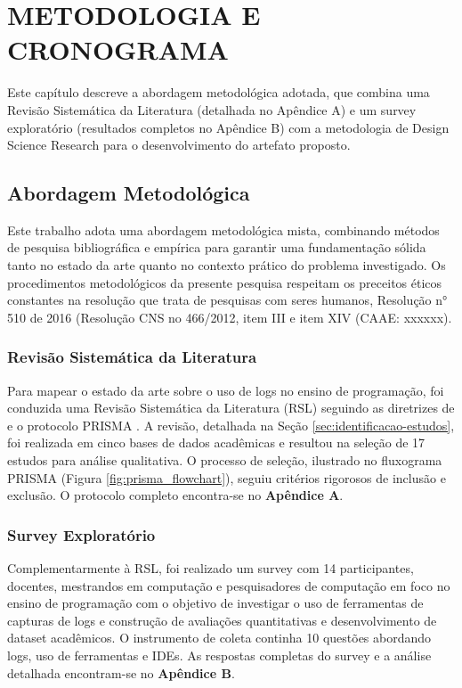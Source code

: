 \chapter{METODOLOGIA E CRONOGRAMA}
\label{cap:metodologia}

Este capítulo descreve a abordagem metodológica adotada, que combina uma Revisão Sistemática da Literatura (detalhada no Apêndice A) e um survey exploratório (resultados completos no Apêndice B) com a metodologia de Design Science Research para o desenvolvimento do artefato proposto. 

\section{Abordagem Metodológica}
\label{sec:abordagem-metodologica}
Este trabalho adota uma abordagem metodológica mista, combinando métodos de pesquisa bibliográfica e empírica para garantir uma fundamentação sólida tanto no estado da arte quanto no contexto prático do problema investigado. Os procedimentos metodológicos da presente pesquisa respeitam os preceitos éticos constantes na resolução que trata de pesquisas com seres humanos, Resolução n° 510 de 2016 (Resolução CNS no 466/2012, item III e item XIV (CAAE: xxxxxx).

\subsection{Revisão Sistemática da Literatura}
\label{subsec:revisao-sistematica}

Para mapear o estado da arte sobre o uso de logs no ensino de programação, foi conduzida uma Revisão Sistemática da Literatura (RSL) seguindo as diretrizes de \cite{kitchenham2004procedures} e o protocolo PRISMA \cite{page2021prisma}. A revisão, detalhada na Seção \ref{sec:identificacao-estudos}, foi realizada em cinco bases de dados acadêmicas e resultou na seleção de 17 estudos para análise qualitativa. O processo de seleção, ilustrado no fluxograma PRISMA (Figura \ref{fig:prisma_flowchart}), seguiu critérios rigorosos de inclusão e exclusão. O protocolo completo encontra-se no \textbf{Apêndice A}.

\subsection{Survey Exploratório}
\label{subsec:survey}

Complementarmente à RSL, foi realizado um survey com 14 participantes, docentes, mestrandos em computação e pesquisadores de computação em foco no ensino de programação com o objetivo de investigar o uso de ferramentas de capturas de logs e construção de avaliações quantitativas e desenvolvimento de dataset acadêmicos. O instrumento de coleta continha 10 questões abordando logs, uso de ferramentas e IDEs. As respostas completas do survey e a análise detalhada encontram-se no \textbf{Apêndice B}.

